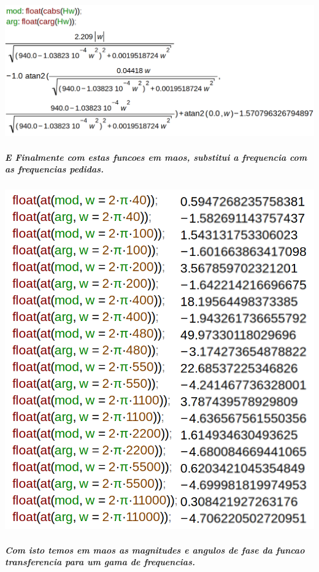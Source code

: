 \documentclass[12pt,twoside, a4paper, twocolumn]{article}
\begin{document}
\subparagraph*{}

\begin{adjustbox}{scale=0.21}
    \includegraphics{modarg.png}
\end{adjustbox}

\subparagraph*{E Finalmente com estas funcoes em maos, substitui a frequencia com as frequencias pedidas.}

\subparagraph*{}

\begin{adjustbox}{scale=0.30}
    \includegraphics{resultados.png}
\end{adjustbox}

\subparagraph*{Com isto temos em maos as magnitudes e angulos de fase da funcao transferencia para um gama de frequencias.}
\end{document}
